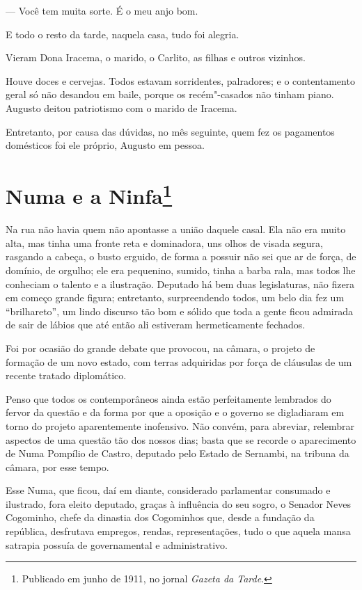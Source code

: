 --- Você tem muita sorte. É o meu anjo bom.

E todo o resto da tarde, naquela casa, tudo foi alegria.

Vieram Dona Iracema, o marido, o Carlito, as filhas e outros vizinhos.

Houve doces e cervejas. Todos estavam sorridentes, palradores; e o
contentamento geral só não desandou em baile, porque os recém"-casados
não tinham piano. Augusto deitou patriotismo com o marido de Iracema.

Entretanto, por causa das dúvidas, no mês seguinte, quem fez os
pagamentos domésticos foi ele próprio, Augusto em pessoa.



\chapter[Numa e a Ninfa]{Numa e a Ninfa\footnote[*]{Publicado em junho de 1911, no jornal \emph{Gazeta da Tarde}.}}

Na rua não havia quem não apontasse a união daquele casal. Ela não era
muito alta, mas tinha uma fronte reta e dominadora, uns olhos de visada
segura, rasgando a cabeça, o busto erguido, de forma a possuir não sei
que ar de força, de domínio, de orgulho; ele era pequenino, sumido,
tinha a barba rala, mas todos lhe conheciam o talento e a ilustração.
Deputado há bem duas legislaturas, não fizera em começo grande figura;
entretanto, surpreendendo todos, um belo dia fez um ``brilhareto'', um
lindo discurso tão bom e sólido que toda a gente ficou admirada de sair
de lábios que até então ali estiveram hermeticamente fechados.

Foi por ocasião do grande debate que provocou, na câmara, o projeto de
formação de um novo estado, com terras adquiridas por força de cláusulas
de um recente tratado diplomático.

Penso que todos os contemporâneos ainda estão perfeitamente lembrados do
fervor da questão e da forma por que a oposição e o governo se
digladiaram em torno do projeto aparentemente inofensivo. Não convém,
para abreviar, relembrar aspectos de uma questão tão dos nossos dias;
basta que se recorde o aparecimento de Numa Pompílio de Castro, deputado
pelo Estado de Sernambi, na tribuna da câmara, por esse tempo.

Esse Numa, que ficou, daí em diante, considerado parlamentar consumado e
ilustrado, fora eleito deputado, graças à influência do seu sogro, o
Senador Neves Cogominho, chefe da dinastia dos Cogominhos que, desde a
fundação da república, desfrutava empregos, rendas, representações, tudo
o que aquela mansa satrapia possuía de governamental e administrativo.

